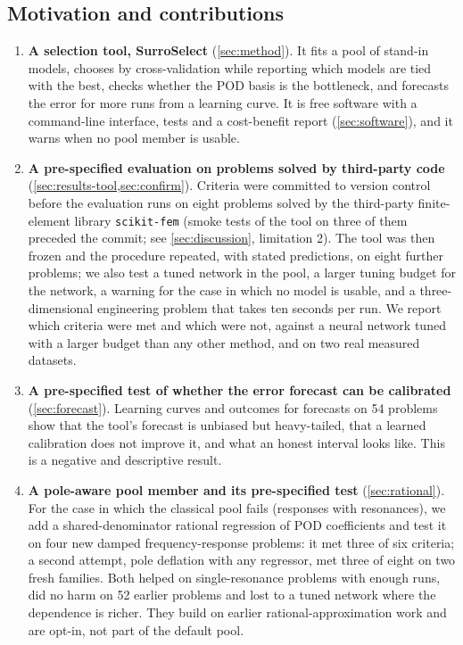 \subsection*{Motivation and contributions}
\begin{enumerate}
\item \textbf{A selection tool, SurroSelect} (\cref{sec:method}). It fits a pool of stand-in models, chooses by cross-validation while reporting which models are tied with the best, checks whether the POD basis is the bottleneck, and forecasts the error for more runs from a learning curve. It is free software with a command-line interface, tests and a cost-benefit report (\cref{sec:software}), and it warns when no pool member is usable.
\item \textbf{A pre-specified evaluation on problems solved by third-party code} (\cref{sec:results-tool,sec:confirm}). Criteria were committed to version control before the evaluation runs on eight problems solved by the third-party finite-element library \texttt{scikit-fem} (smoke tests of the tool on three of them preceded the commit; see \cref{sec:discussion}, limitation 2). The tool was then frozen and the procedure repeated, with stated predictions, on eight further problems; we also test a tuned network in the pool, a larger tuning budget for the network, a warning for the case in which no model is usable, and a three-dimensional engineering problem that takes ten seconds per run. We report which criteria were met and which were not, against a neural network tuned with a larger budget than any other method, and on two real measured datasets.
\item \textbf{A pre-specified test of whether the error forecast can be calibrated} (\cref{sec:forecast}). Learning curves and outcomes for \SfAllCases{} forecasts on 54 problems show that the tool's forecast is unbiased but heavy-tailed, that a learned calibration does not improve it, and what an honest interval looks like. This is a negative and descriptive result.
\item \textbf{A pole-aware pool member and its pre-specified test} (\cref{sec:rational}). For the case in which the classical pool fails (responses with resonances), we add a shared-denominator rational regression of POD coefficients and test it on four new damped frequency-response problems: it met three of six criteria; a second attempt, pole deflation with any regressor, met three of eight on two fresh families. Both helped on single-resonance problems with enough runs, did no harm on 52 earlier problems and lost to a tuned network where the dependence is richer. They build on earlier rational-approximation work and are opt-in, not part of the default pool.

\end{enumerate}
